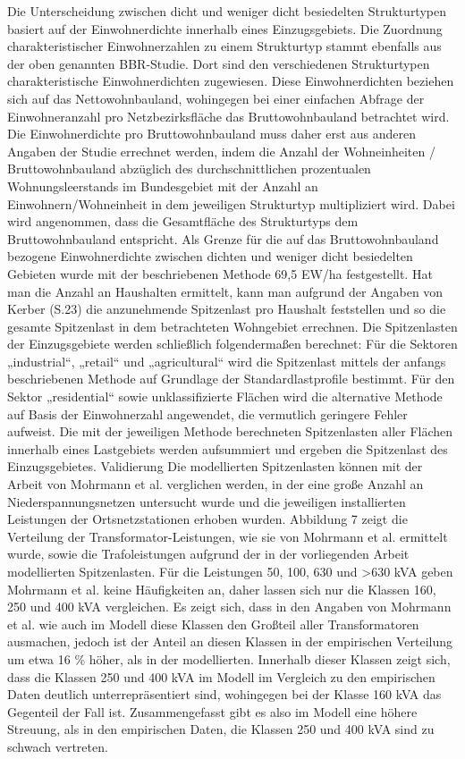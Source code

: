\documentclass[11pt]{scrreprt}
\begin{document}
Die Unterscheidung zwischen dicht und weniger dicht besiedelten Strukturtypen basiert auf der Einwohnerdichte innerhalb eines Einzugsgebiets. Die Zuordnung charakteristischer Einwohnerzahlen zu einem Strukturtyp stammt ebenfalls aus der oben genannten BBR-Studie. Dort sind den verschiedenen Strukturtypen charakteristische Einwohnerdichten zugewiesen. Diese Einwohnerdichten beziehen sich auf das Nettowohnbauland, wohingegen bei einer einfachen Abfrage der Einwohneranzahl pro Netzbezirksfläche das Bruttowohnbauland betrachtet wird. Die Einwohnerdichte pro Bruttowohnbauland muss daher erst aus anderen Angaben der Studie errechnet werden, indem die Anzahl der Wohneinheiten / Bruttowohnbauland abzüglich des durchschnittlichen prozentualen Wohnungsleerstands im Bundesgebiet mit der Anzahl an Einwohnern/Wohneinheit in dem jeweiligen Strukturtyp multipliziert wird. Dabei wird angenommen, dass die Gesamtfläche des Strukturtyps dem Bruttowohnbauland entspricht. Als Grenze für die auf das Bruttowohnbauland bezogene Einwohnerdichte zwischen dichten und weniger dicht besiedelten Gebieten wurde mit der beschriebenen Methode 69,5 EW/ha festgestellt.
Hat man die Anzahl an Haushalten ermittelt, kann man aufgrund der Angaben von Kerber (S.23) die anzunehmende Spitzenlast pro Haushalt feststellen und so die gesamte Spitzenlast in dem betrachteten Wohngebiet errechnen.
Die Spitzenlasten der Einzugsgebiete werden schließlich folgendermaßen berechnet: Für die Sektoren „industrial“, „retail“ und „agricultural“ wird die Spitzenlast mittels der anfangs beschriebenen Methode auf Grundlage der Standardlastprofile bestimmt. Für den Sektor „residential“ sowie unklassifizierte Flächen wird die alternative Methode auf Basis der Einwohnerzahl angewendet, die vermutlich geringere Fehler aufweist. Die mit der jeweiligen Methode berechneten Spitzenlasten aller Flächen innerhalb eines Lastgebiets werden aufsummiert und ergeben die Spitzenlast des Einzugsgebietes. 
Validierung 
Die modellierten Spitzenlasten können mit der Arbeit von Mohrmann et al. verglichen werden, in der eine große Anzahl an Niederspannungsnetzen untersucht wurde und die jeweiligen installierten Leistungen der Ortsnetzstationen erhoben wurden. Abbildung 7 zeigt die Verteilung der Transformator-Leistungen, wie sie von Mohrmann et al. ermittelt wurde, sowie die Trafoleistungen  aufgrund der in der vorliegenden Arbeit modellierten Spitzenlasten. Für die Leistungen 50, 100, 630 und >630 kVA geben Mohrmann et al. keine Häufigkeiten an, daher lassen sich nur die Klassen 160, 250 und 400 kVA vergleichen. Es zeigt sich, dass in den Angaben von Mohrmann et al. wie auch im Modell diese Klassen den Großteil aller Transformatoren ausmachen, jedoch ist der Anteil an diesen Klassen in der empirischen Verteilung um etwa 16 \% höher, als in der modellierten.  Innerhalb dieser Klassen zeigt sich, dass die Klassen 250 und 400 kVA im Modell im Vergleich zu den empirischen Daten deutlich unterrepräsentiert sind, wohingegen bei der Klasse 160 kVA das Gegenteil der Fall ist. Zusammengefasst gibt es also im Modell eine höhere Streuung, als in den empirischen Daten, die Klassen 250 und 400 kVA sind zu schwach vertreten. 
\end{document}
